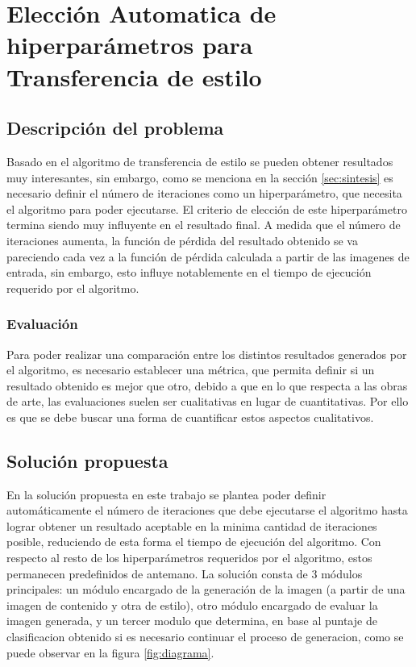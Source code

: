 \documentclass[a4paper,11pt,spanish]{book}
\begin{document}
\chapter{Elección Automatica de hiperparámetros para Transferencia de estilo}
  \section{Descripción del problema}
    Basado en el algoritmo de transferencia de estilo se pueden obtener resultados muy interesantes, sin embargo, como se menciona en la sección \ref{sec:sintesis}
    es necesario definir el número de iteraciones como un hiperparámetro, que necesita el algoritmo para poder ejecutarse.
    El criterio de elección de este hiperparámetro termina siendo muy influyente en el resultado final. A medida que el número de iteraciones
    aumenta, la función de pérdida del resultado obtenido se va pareciendo cada vez a la función de pérdida calculada a partir de las imagenes de entrada, sin embargo,
    esto influye notablemente en el tiempo de ejecución requerido por el algoritmo.

    \subsection{Evaluación \label{sec:evaluacion}}
      Para poder realizar una comparación entre los distintos resultados generados por el algoritmo, es necesario establecer una métrica, que permita definir si un resultado
      obtenido es mejor que otro, debido a que en lo que respecta a las obras de arte, las evaluaciones suelen ser cualitativas en lugar de cuantitativas.
      Por ello es que se debe buscar una forma de cuantificar estos aspectos cualitativos.

  \section{Solución propuesta \label{sec:solucion}}
    En la solución propuesta en este trabajo se plantea poder definir automáticamente el número de iteraciones que debe ejecutarse el algoritmo hasta lograr obtener un resultado
    aceptable en la minima cantidad de iteraciones posible, reduciendo de esta forma el tiempo de ejecución del algoritmo.
    Con respecto al resto de los hiperparámetros  requeridos por el algoritmo, estos permanecen predefinidos de  antemano.
    La solución consta de 3 módulos principales: un módulo encargado de la generación de la imagen (a partir de una imagen de contenido y otra de estilo), otro módulo encargado de
    evaluar la imagen generada, y un tercer modulo que determina, en base al puntaje de clasificacion obtenido si es necesario continuar el proceso de generacion, como se puede
    observar en la figura \ref{fig:diagrama}.
\end{document}
